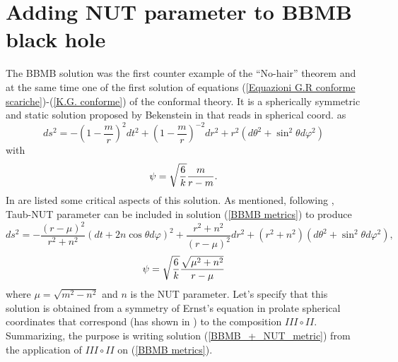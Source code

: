 \section{Adding NUT parameter to BBMB black hole} \label{sezione bbmb+nut}
The BBMB solution was the first counter example of the ``No-hair'' theorem and at the same time one of the first solution of equations (\ref{Equazioni G.R conforme scariche})-(\ref{K.G. conforme}) of the conformal theory. It is a spherically symmetric and static solution proposed by Bekenstein in \citep{mappaBekenstein} that reads in spherical coord. as 
\begin{equation}
    ds^2 = -\left(1-\frac{m}{r}\right)^2dt^2 + \left(1-\frac{m}{r}\right)^{-2}dr^2 + r^2(d\theta^2 + \sin^2\theta d\varphi^2)
    \label{BBMB metrics}
\end{equation}
with 
\begin{equation}
    \psi = \sqrt{\frac{6}{k}}\frac{m}{r-m}. \notag
\end{equation}
In \citep{C-metric} are listed some critical aspects of this solution. As mentioned, following \citep{Caldarelli_Charmousis}, Taub-NUT parameter can be included in solution (\ref{BBMB metrics}) to produce 
\begin{equation}
    ds^2 = - \frac{(r-\mu)^2}{r^2 + n^2}(dt+2n\cos\theta d\varphi)^2 + \frac{r^2 + n^2}{(r-\mu)^2}dr^2 + (r^2+n^2)(d\theta^2 + \sin^2\theta d\varphi^2),
    \label{BBMB_+_NUT_metric}
\end{equation}
\begin{equation}
    \psi=\sqrt{\frac{6}{k}}\frac{\sqrt{\mu^2+n^2}}{r-\mu} \notag
\end{equation}
where $\mu = \sqrt{m^2-n^2}$ and $n$ is the NUT parameter. Let's specify that this solution  is obtained from a symmetry of Ernst's equation in prolate spherical coordinates that correspond (has shown in \citep{enhanced}) to the composition $III \circ II$. Summarizing, the purpose is writing solution (\ref{BBMB_+_NUT_metric}) from the application of $III \circ II$ on (\ref{BBMB metrics}).

